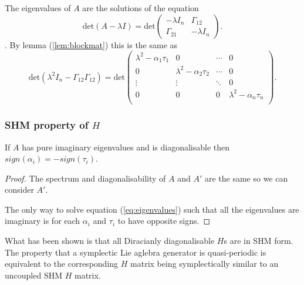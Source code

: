 The eigenvalues of $A$ are the solutions of the equation
\begin{equation}
\text{det}(A-\lambda I) = \text{det}\begin{pmatrix} -\lambda I_{n} & \Gamma_{12} \\ \Gamma_{21} & -\lambda I_{n} \end{pmatrix}.
\end{equation}.
By lemma (\ref{lem:blockmat}) this is the same as 
\begin{equation}
\text{det}(\lambda^2 I_{n}-\Gamma_{12}\Gamma_{12}) = \text{det}\begin{pmatrix} 
\lambda^2 - \alpha_1\tau_1 & 0 & \cdots & 0 \\ 
0 & \lambda^2 - \alpha_2\tau_2 & \cdots & 0 \\
\vdots & \vdots & \ddots & 0 \\
0 & 0 & 0 & \lambda^2 - \alpha_n\tau_n \\ 
\end{pmatrix}. \label{eq:eigenvalues}
\end{equation}

\subsubsection{SHM property of $H$}
\begin{proposition}
If $A$ has pure imaginary eigenvalues and is diagonalisable then $sign(\alpha_i) = -sign(\tau_i)$.
\end{proposition}
\begin{proof}
The spectrum and diagonalisability of $A$ and $A'$ are the same so we can consider $A'$.

The only way to solve equation (\ref{eq:eigenvalues}) such that all the eigenvalues are imaginary is for each $\alpha_i$ and $\tau_i$ to have opposite signs.
\end{proof}

What has been shown is that all Diracianly diagonalisable $H$s are in SHM form. The property that a symplectic Lie aglebra generator is quasi-periodic is equivalent to the corresponding $H$ matrix being symplectically similar to an uncoupled SHM $H$ matrix.

